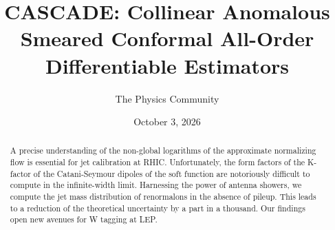 \documentclass[11pt]{article}
\title{CASCADE: Collinear Anomalous Smeared Conformal All-Order Differentiable Estimators}
\author{The Physics Community}
\date{October 3, 2026}
\numberwithin{equation}{section}
\theoremstyle{definition}
\theoremstyle{remark}
\begin{document}
\maketitle
\begin{abstract}
A precise understanding of the non-global logarithms of the approximate
normalizing flow is essential for jet calibration at RHIC.
Unfortunately, the form factors of the K-factor of the Catani-Seymour
dipoles of the soft function are notoriously difficult to compute in the
infinite-width limit. Harnessing the power of antenna showers, we
compute the jet mass distribution of renormalons in the absence of
pileup. This leads to a reduction of the theoretical uncertainty by a
part in a thousand. Our findings open new avenues for W tagging at LEP.
\end{abstract}
\tableofcontents





\nocite{*}


\end{document}
